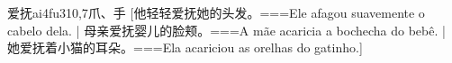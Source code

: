 \begin{EntryWithPhonetic}{爱抚}{ai4fu3}{10,7}{⽖、⼿}
  [他轻轻爱抚她的头发。===Ele afagou suavemente o cabelo dela. | 母亲爱抚婴儿的脸颊。===A mãe acaricia a bochecha do bebê. | 她爱抚着小猫的耳朵。===Ela acariciou as orelhas do gatinho.]
\end{EntryWithPhonetic}
